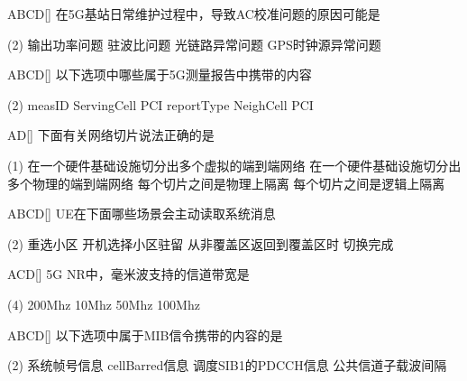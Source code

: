 \begin{choice}{\;ABCD\;}[]
    在5G基站日常维护过程中，导致AC校准问题的原因可能是
    \begin{tasks}(2)
        \task 输出功率问题
        \task 驻波比问题
        \task 光链路异常问题
        \task GPS时钟源异常问题
    \end{tasks}
\end{choice}

\begin{choice}{\;ABCD\;}[]
    以下选项中哪些属于5G测量报告中携带的内容
    \begin{tasks}(2)
        \task measID
        \task ServingCell PCI
        \task reportType
        \task NeighCell PCI
    \end{tasks}
\end{choice}


\begin{choice}{\;AD\;}[]
    下面有关网络切片说法正确的是
    \begin{tasks}(1)
        \task 在一个硬件基础设施切分出多个虚拟的端到端网络
        \task 在一个硬件基础设施切分出多个物理的端到端网络
        \task 每个切片之间是物理上隔离
        \task 每个切片之间是逻辑上隔离
    \end{tasks}
\end{choice}


\begin{choice}{\;ABCD\;}[]
    UE在下面哪些场景会主动读取系统消息
    \begin{tasks}(2)
        \task 重选小区
        \task 开机选择小区驻留
        \task 从非覆盖区返回到覆盖区时
        \task 切换完成
    \end{tasks}
\end{choice}


\begin{choice}{\;ACD\;}[]
    5G NR中，毫米波支持的信道带宽是
    \begin{tasks}(4)
        \task 200Mhz
        \task 10Mhz
        \task 50Mhz
        \task 100Mhz
    \end{tasks}
\end{choice}

\begin{choice}{\;ABCD\;}[]
    以下选项中属于MIB信令携带的内容的是
    \begin{tasks}(2)
        \task 系统帧号信息
        \task cellBarred信息
        \task 调度SIB1的PDCCH信息
        \task 公共信道子载波间隔
    \end{tasks}
\end{choice}

